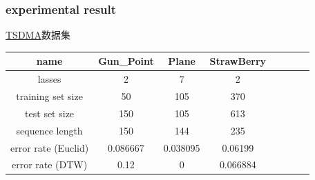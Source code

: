 \documentclass[xetex,mathserif,serif]{beamer}
\begin{document}
\begin{frame}
\centering
\frametitle{experimental result}
\begin{flushleft}
  \href{http://www.cs.ucr.edu/~eamonn/time_series_data/}{TSDMA}数据集
\end{flushleft}
    \begin{center}
      \begin{tabular}{|c|c|c|c|c|c|c|c|}
      \hline
      name & Gun\_Point & Plane & StrawBerry \\
      \hline
      lasses & 2 & 7 & 2 \\
      \hline
      training set size  & 50 & 105 & 370 \\
      \hline
      test set size  & 150 & 105 & 613 \\
      \hline
      sequence length & 150 & 144 & 235 \\
      \hline
      error rate (Euclid) & 0.086667 & 0.038095 & 0.06199 \\
      \hline
      error rate (DTW) & 0.12 & 0 & 0.066884 \\
      \hline
    \end{tabular}
    \end{center}
\end{frame}
\end{document}
